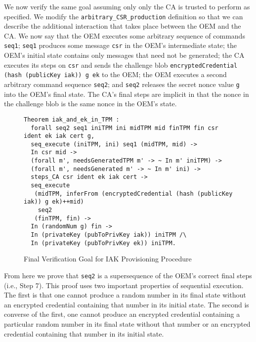 \documentclass[runningheads]{llncs}
\begin{document}
We now verify the same goal assuming only only the CA is trusted to
perform as specified.  We modify the \verb|arbitrary_CSR_production|
definition so that we can describe the additional interaction that
takes place between the OEM and the CA. We now say that the OEM
executes some arbitrary sequence of commands \verb|seq1|; \verb|seq1|
produces some message \verb|csr| in the OEM's intermediate state; the
OEM's initial state contains only messages that need not be generated;
the CA executes its steps on \verb|csr| and sends the challenge blob
\verb|encryptedCredential (hash (publicKey iak)) g ek| to the OEM; the
OEM executes a second arbitrary command sequence \verb|seq2|; and
\verb|seq2| releases the secret nonce value \verb|g| into the OEM's
final state. The CA's final steps are implicit in that the nonce in
the challenge blob is the same nonce in the OEM's state.

\begin{figure}[hptb]
\vspace{-\medskipamount}
\vspace{-\medskipamount}
\begin{lstlisting}[language=Coq]
Theorem iak_and_ek_in_TPM :
  forall seq2 seq1 iniTPM ini midTPM mid finTPM fin csr ident ek iak cert g,
  seq_execute (iniTPM, ini) seq1 (midTPM, mid) -> 
  In csr mid ->
  (forall m', needsGeneratedTPM m' -> ~ In m' iniTPM) ->
  (forall m', needsGenerated m' -> ~ In m' ini) ->
  steps_CA csr ident ek iak cert ->
  seq_execute
   (midTPM, inferFrom (encryptedCredential (hash (publicKey iak)) g ek)++mid)
    seq2 
   (finTPM, fin) ->
  In (randomNum g) fin ->
  In (privateKey (pubToPrivKey iak)) iniTPM /\ 
  In (privateKey (pubToPrivKey ek)) iniTPM.
\end{lstlisting}
\caption{Final Verification Goal for IAK Provisioning Procedure}
\label{fig:iak_goal}
\end{figure}

From here we prove that \verb|seq2| is a supersequence of the OEM's
correct final steps (i.e., Step 7). This proof uses two important
properties of sequential execution. The first is that one cannot
produce a random number in its final state without an encrypted
credential containing that number in its initial state. The second is
converse of the first, one cannot produce an encrypted credential
containing a particular random number in its final state without that
number or an encrypted credential containing that number in its
initial state.
\end{document}
